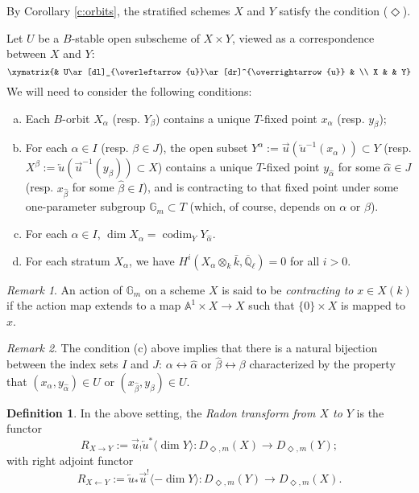 \documentclass{amsart}
\theoremstyle{plain}
\theoremstyle{definition}
\newtheorem{defn}[subsubsection]{Definition}
\theoremstyle{remark}
\newtheorem*{remark}{Remark}
\numberwithin{equation}{subsection}
\begin{document}
By Corollary \ref{c:orbits}, the stratified schemes $X$ and $Y$ satisfy the condition ($\Diamond$).

Let $U$ be a $B$-stable open subscheme of $X\times Y$, viewed as a correspondence between $X$ and $Y$:
\begin{equation*}
\xymatrix{& U\ar[dl]_{\overleftarrow{u}}\ar[dr]^{\overrightarrow{u}} & \\ X & & Y}
\end{equation*}
We will need to consider the following conditions:
\begin{enumerate}[(a)]
\item Each $B$-orbit $X_{\alpha}$ (resp. $Y_{\beta}$) contains a unique $T$-fixed point $x_\alpha$ (resp. $y_{\beta}$);
\item For each $\alpha\in I$ (resp. $\beta\in J$), the open subset $Y^{\alpha}:=\overrightarrow{u}(\overleftarrow{u}^{-1}(x_\alpha))\subset Y$ (resp. $X^{\beta}:=\overleftarrow{u}(\overrightarrow{u}^{-1}(y_\beta))\subset X$) contains a unique $T$-fixed point $y_{\hat{\alpha}}$ for some $\hat{\alpha}\in J$ (resp. $x_{\hat{\beta}}$ for some $\hat{\beta}\in I$), and is contracting to that fixed point under some one-parameter subgroup ${\mathbb{G}}_m\subset T$ (which, of course, depends on $\alpha$ or $\beta$).
\item For each $\alpha\in I$, $\dim X_\alpha=\operatorname{codim}_Y Y_{\hat{\alpha}}$.
\item For each stratum $X_\alpha$, we have $H^i({{X_\alpha}\otimes_k\bar{k}},{\overline{\mathbb{Q}}_{\ell}})=0$ for all $i>0$.
\end{enumerate}

\begin{remark}
An action of ${\mathbb{G}}_m$ on a scheme $X$ is said to be {\em contracting to} $x\in X(k)$ if the action map extends to a map ${\mathbb{A}}^1\times X\to X$ such that $\{0\}\times X$ is mapped to $x$.
\end{remark}

\begin{remark}
The condition (c) above implies that there is a natural bijection between the index sets $I$ and $J$: $\alpha\leftrightarrow\hat{\alpha}$ or $\hat{\beta}\leftrightarrow\beta$ characterized by the property that $(x_\alpha,y_{\hat{\alpha}})\in U$ or $(x_{\hat{\beta}},y_\beta)\in U$. 
\end{remark}

\begin{defn}
In the above setting, the {\em Radon transform from $X$ to $Y$} is the functor
\begin{equation*}
R_{X\to Y}:=\overrightarrow{u}_!\overleftarrow{u}^*{\langle{{\dim Y}}\rangle}: {D_{\Diamond,m}({X})}\to {D_{\Diamond,m}({Y})};
\end{equation*}
with right adjoint functor
\begin{equation*}
R_{X\leftarrow Y}:=\overleftarrow{u}_*\overrightarrow{u}^!{\langle{{-\dim Y}}\rangle}: {D_{\Diamond,m}({Y})}\to{D_{\Diamond,m}({X})}.
\end{equation*}
\end{defn}
\end{document}
